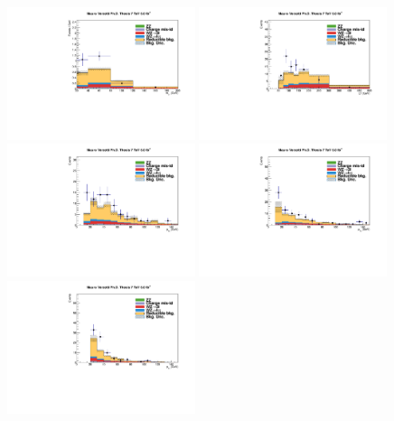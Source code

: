 \begin{figure}
\begin{center}
  \includegraphics[width=0.49\textwidth]{4_Analisys/pics/7TeV/plots/emt/f3/Full/final-f3-subMass-Full.pdf}
  \includegraphics[width=0.49\textwidth]{4_Analisys/pics/7TeV/plots/emt/f3/final-f3-LT.pdf}\\
  \includegraphics[width=0.49\textwidth]{4_Analisys/pics/7TeV/plots/emt/f3/Full/final-f3-ePt-Full.pdf}
  \includegraphics[width=0.49\textwidth]{4_Analisys/pics/7TeV/plots/emt/f3/Full/final-f3-mPt-Full.pdf}\\
  \includegraphics[width=0.49\textwidth]{4_Analisys/pics/7TeV/plots/emt/f3/Full/final-f3-tPt-Full.pdf}

\end{center}
\end{figure}
